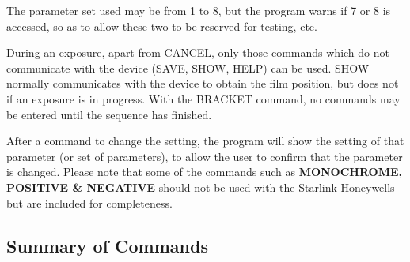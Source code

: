 The parameter set used may be from 1 to 8, but the program warns if
7 or 8 is accessed, so as to allow these two to be reserved for testing,
etc.

During an exposure, apart from CANCEL, only those commands which do not
communicate with the device (SAVE, SHOW, HELP) can be used. SHOW normally
communicates with the device to obtain the film position, but does not
if an exposure is in progress. With the BRACKET command, no commands may
be entered until the sequence has finished.

After a command to change the setting, the program will show the setting
of that parameter (or set of parameters), to allow the user to confirm
that the parameter is changed. Please note that some of the commands
such as {\bf MONOCHROME, POSITIVE \& NEGATIVE} should not be used with the
Starlink Honeywells but are included for completeness.

\subsection{Summary of Commands}

